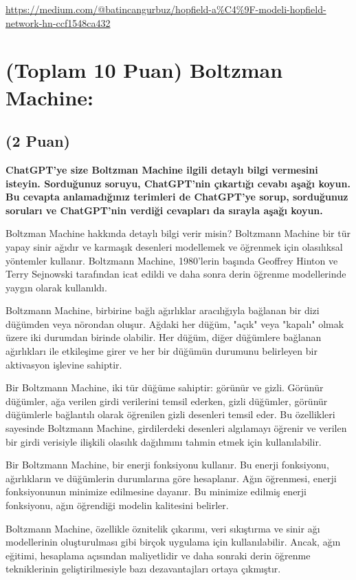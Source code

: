 \documentclass[11pt]{article}
\begin{document}
\url{https://medium.com/@batincangurbuz/hopfield-a%C4%9F-modeli-hopfield-network-hn-ccf1548ca432}


\section{(Toplam 10 Puan) Boltzman Machine:}

\subsection{(2 Puan)} \textbf{ChatGPT’ye size Boltzman Machine ilgili detaylı bilgi vermesini isteyin. Sorduğunuz soruyu, ChatGPT'nin çıkartığı cevabı aşağı koyun. Bu cevapta anlamadığınız terimleri de ChatGPT’ye sorup, sorduğunuz soruları ve ChatGPT’nin verdiği cevapları da sırayla aşağı koyun.}

Boltzman Machine hakkında detaylı bilgi verir misin? 
Boltzmann Machine bir tür yapay sinir ağıdır ve karmaşık desenleri modellemek ve öğrenmek için olasılıksal yöntemler kullanır. Boltzmann Machine, 1980'lerin başında Geoffrey Hinton ve Terry Sejnowski tarafından icat edildi ve daha sonra derin öğrenme modellerinde yaygın olarak kullanıldı.

Boltzmann Machine, birbirine bağlı ağırlıklar aracılığıyla bağlanan bir dizi düğümden veya nörondan oluşur. Ağdaki her düğüm, "açık" veya "kapalı" olmak üzere iki durumdan birinde olabilir. Her düğüm, diğer düğümlere bağlanan ağırlıkları ile etkileşime girer ve her bir düğümün durumunu belirleyen bir aktivasyon işlevine sahiptir.

Bir Boltzmann Machine, iki tür düğüme sahiptir: görünür ve gizli. Görünür düğümler, ağa verilen girdi verilerini temsil ederken, gizli düğümler, görünür düğümlerle bağlantılı olarak öğrenilen gizli desenleri temsil eder. Bu özellikleri sayesinde Boltzmann Machine, girdilerdeki desenleri algılamayı öğrenir ve verilen bir girdi verisiyle ilişkili olasılık dağılımını tahmin etmek için kullanılabilir.

Bir Boltzmann Machine, bir enerji fonksiyonu kullanır. Bu enerji fonksiyonu, ağırlıkların ve düğümlerin durumlarına göre hesaplanır. Ağın öğrenmesi, enerji fonksiyonunun minimize edilmesine dayanır. Bu minimize edilmiş enerji fonksiyonu, ağın öğrendiği modelin kalitesini belirler.

Boltzmann Machine, özellikle öznitelik çıkarımı, veri sıkıştırma ve sinir ağı modellerinin oluşturulması gibi birçok uygulama için kullanılabilir. Ancak, ağın eğitimi, hesaplama açısından maliyetlidir ve daha sonraki derin öğrenme tekniklerinin geliştirilmesiyle bazı dezavantajları ortaya çıkmıştır.
\end{document}
